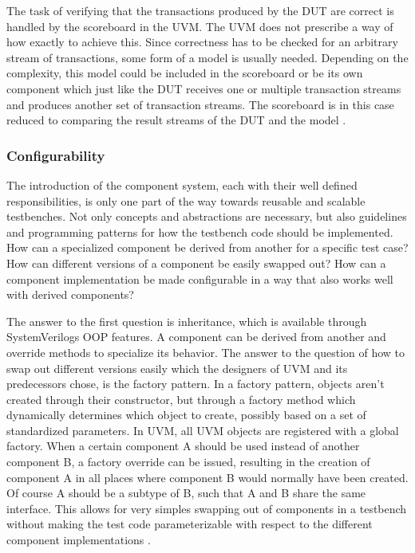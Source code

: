 \documentclass[11pt]{report}
\begin{document}
The task of verifying that the transactions produced by the DUT are correct is handled by the scoreboard in the UVM.
The UVM does not prescribe a way of how exactly to achieve this. Since correctness has to be checked for an arbitrary
stream of transactions, some form of a model is usually needed. Depending on the complexity, this model could be
included in the scoreboard or be its own component which just like the DUT receives one or multiple transaction
streams and produces another set of transaction streams. The scoreboard is in this case reduced to comparing the
result streams of the DUT and the model \cite{}.

\subsubsection{Configurability} %

The introduction of the component system, each with their well defined responsibilities, is only one part of the way
towards reusable and scalable testbenches. Not only concepts and abstractions are necessary, but also guidelines and
programming patterns for how the testbench code should be implemented. How can a specialized component be derived
from another for a specific test case? How can different versions of a component be easily swapped out? How can a
component implementation be made configurable in a way that also works well with derived components?

The answer to the first question is inheritance, which is available through SystemVerilogs OOP features. A component
can be derived from another and override methods to specialize its behavior. The answer to the question of how to
swap out different versions easily which the designers of UVM and its predecessors chose, is the factory pattern. In
a factory pattern, objects aren't created through their constructor, but through a factory method which dynamically
determines which object to create, possibly based on a set of standardized parameters. In UVM, all UVM objects are
registered with a global factory. When a certain component A should be used instead of another component B, a factory
override can be issued, resulting in the creation of component A in all places where component B would normally have
been created. Of course A should be a subtype of B, such that A and B share the same interface. This allows for very
simples swapping out of components in a testbench without making the test code parameterizable with respect to the
different component implementations \cite[Ch. 13]{salemi2013uvm}.
\end{document}

